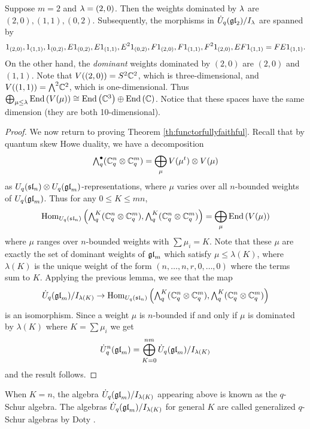\documentclass[11pt]{amsart}
\begin{document}
\begin{example}
Suppose $m=2$ and $\lambda = (2,0)$. Then the weights dominated by $\lambda$ are $(2,0), (1,1), (0,2)$. Subsequently,  the morphisms in $\dot{U}_q({\mathfrak{gl}}_2)/I_\lambda$ are spanned by
$$1_{(2,0)}, 1_{(1,1)}, 1_{(0,2)}, E 1_{(0,2)}, E 1_{(1,1)}, E^2 1_{(0,2)}, F 1_{(2,0)}, F1_{(1,1)}, F^2 1_{(2,0)}, EF1_{(1,1)} = FE1_{(1,1)}.$$
On the other hand, the \emph{dominant} weights dominated by $(2,0)$ are $(2,0)$ and $(1,1)$. Note that $V((2,0)) = S^2 {\mathbb{C}}^2 $, which is three-dimensional, and $V((1,1)) = {\textstyle\bigwedge^{2}_{}} {\mathbb{C}}^2 $, which is one-dimensional.  Thus $\bigoplus_{\mu \le \lambda} \operatorname{End}\left(V(\mu)\right) \cong \operatorname{End}\left({\mathbb{C}}^3\right) \oplus \operatorname{End}\left({\mathbb{C}}\right)$. Notice that these spaces have the same dimension (they are both 10-dimensional).
\end{example}

\begin{proof}
We now return to proving Theorem \ref{th:functorfullyfaithful}. Recall that by quantum skew Howe duality, we have a decomposition
$$ {\textstyle\bigwedge^{\bullet}_{q}} ({\mathbb{C}}_q^n \otimes {\mathbb{C}}_q^m) = \bigoplus_{\mu} V(\mu^t) \otimes V(\mu) $$
as $U_q({\mathfrak{sl}}_n) \otimes U_q({\mathfrak{gl}}_m)$-representations, where $\mu$ varies over all $n$-bounded weights of $U_q({\mathfrak{gl}}_m)$. Thus for any $ 0 \le K \le mn $,
$$ \operatorname{Hom}_{U_q({\mathfrak{sl}}_n)} \left({\textstyle\bigwedge^{K}_{q}}({\mathbb{C}}_q^n \otimes {\mathbb{C}}_q^m), {\textstyle\bigwedge^{K}_{q}}({\mathbb{C}}_q^n \otimes {\mathbb{C}}_q^m)\right) = \bigoplus_{\mu} \operatorname{End}\left(V(\mu)\right) $$
where $ \mu $ ranges over $ n$-bounded weights with $ \sum \mu_i = K $.  Note that these $\mu $ are exactly the set of dominant weights of $ {\mathfrak{gl}}_m $ which satisfy $ \mu \le \lambda(K) $, where $ \lambda(K) $ is the unique weight of the form $(n, \dots, n, r, 0, \dots, 0) $ where the terms sum to $K$.  Applying the previous lemma, we see that the map
$$ \dot{{U}}_q({\mathfrak{gl}}_m)/I_{\lambda(K)} \rightarrow \operatorname{Hom}_{U_q({\mathfrak{sl}}_n)} \left({\textstyle\bigwedge^{K}_{q}}({\mathbb{C}}_q^n \otimes {\mathbb{C}}_q^m), {\textstyle\bigwedge^{K}_{q}}({\mathbb{C}}_q^n \otimes {\mathbb{C}}_q^m)\right) $$
is an isomorphism. Since a weight $ \mu $ is $n$-bounded if and only if $ \mu $ is dominated by $ \lambda(K) $ where $ K = \sum \mu_i $ we get
$$ \dot{{U}}_q^n({\mathfrak{gl}}_m) = \bigoplus_{K=0}^{nm} \dot{{U}}_q({\mathfrak{gl}}_m)/I_{\lambda(K)} $$
and the result follows.
\end{proof}

\begin{rem}
When $ K = n $, the algebra $ \dot{{U}}_q({\mathfrak{gl}}_m)/I_{\lambda(K)} $ appearing above is known as the $q$-Schur algebra.  The algebras $ \dot{{U}}_q({\mathfrak{gl}}_m)/I_{\lambda(K)} $ for general $ K $ are called generalized $q$-Schur algebras by Doty \cite{MR1990659}.
\end{rem}
\end{document}
